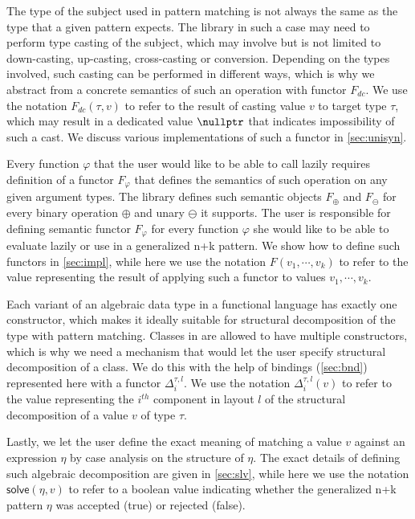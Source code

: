 \noindent
The type of the subject used in pattern matching is not always the same as the 
type that a given pattern expects. The library in such a case may need to 
perform type casting of the subject, which may involve but is not limited to 
down-casting, up-casting, cross-casting or conversion. Depending on the types 
involved, such casting can be performed in different ways, which is why we 
abstract from a concrete semantics of such an operation with functor $F_{dc}$. 
We use the notation $F_{dc}(\tau,v)$ to refer to the result of casting value $v$ 
to target type $\tau$, which may result in a dedicated value $\nullptr$ that 
indicates impossibility of such a cast. We discuss various implementations of 
such a functor in \textsection\ref{sec:unisyn}.

Every function $\varphi$ that the user would like to be able to call lazily 
requires definition of a functor $F_\varphi$ that defines the semantics of such 
operation on any given argument types. The library defines such semantic objects 
$F_\oplus$ and $F_\ominus$ for every binary operation $\oplus$ and unary 
$\ominus$ it supports. The user is responsible for defining semantic functor 
$F_\varphi$ for every function $\varphi$ she would like to be able to evaluate 
lazily or use in a generalized n+k pattern. We show how to define such functors 
in \textsection\ref{sec:impl}, while here we use the notation $F(v_1,\cdots,v_k)$ 
to refer to the value representing the result of applying such a functor to 
values $v_1,\cdots,v_k$.

Each variant of an algebraic data type in a functional language has exactly one 
constructor, which makes it ideally suitable for structural decomposition of the 
type with pattern matching. Classes in \Cpp{} are allowed to have multiple 
constructors, which is why we need a mechanism that would let the user specify 
structural decomposition of a class. We do this with the help of bindings 
(\textsection\ref{sec:bnd}) represented here with a functor $\Delta_i^{\tau,l}$. 
We use the notation $\Delta_i^{\tau,l}(v)$ to refer to the value representing 
the $i^{th}$ component in layout $l$ of the structural decomposition of a value 
$v$ of type $\tau$.

Lastly, we let the user define the exact meaning of matching a value $v$ against 
an expression $\eta$ by case analysis on the structure of $\eta$. The exact 
details of defining such algebraic decomposition are given in 
\textsection\ref{sec:slv}, while here we use the notation $\mathsf{solve}(\eta,v)$ 
to refer to a boolean value indicating whether the generalized n+k pattern 
$\eta$ was accepted (true) or rejected (false).


